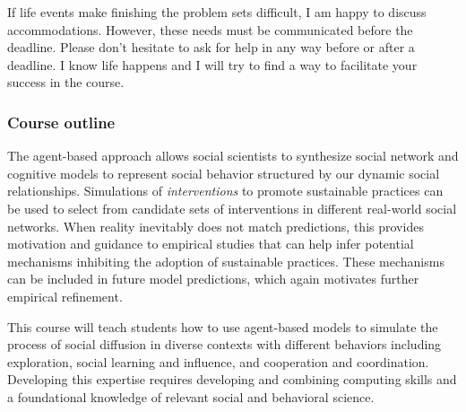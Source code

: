 \documentclass[
  letterpaper,
  DIV=11,
  numbers=noendperiod]{scrartcl}
\begin{document}
If life events make finishing the problem sets difficult, I am happy to
discuss accommodations. However, these needs must be communicated before
the deadline. Please don't hesitate to ask for help in any way before or
after a deadline. I know life happens and I will try to find a way to
facilitate your success in the course.

\subsubsection{Course outline}\label{course-outline}

The agent-based approach allows social scientists to synthesize social
network and cognitive models to represent social behavior structured by
our dynamic social relationships. Simulations of \emph{interventions} to
promote sustainable practices can be used to select from candidate sets
of interventions in different real-world social networks. When reality
inevitably does not match predictions, this provides motivation and
guidance to empirical studies that can help infer potential mechanisms
inhibiting the adoption of sustainable practices. These mechanisms can
be included in future model predictions, which again motivates further
empirical refinement.

This course will teach students how to use agent-based models to
simulate the process of social diffusion in diverse contexts with
different behaviors including exploration, social learning and
influence, and cooperation and coordination. Developing this expertise
requires developing and combining computing skills and a foundational
knowledge of relevant social and behavioral science.
\end{document}
